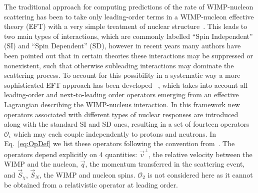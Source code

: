 
The traditional approach for computing predictions of the rate of WIMP-nucleon scattering has been to take only leading-order terms in a WIMP-nucleon effective theory (EFT) with a very simple treatment of nuclear structure~\cite{LEWIN}. This leads to two main types of interactions, which are commonly labelled ``Spin Independent'' (SI) and ``Spin Dependent'' (SD), however in recent years many authors have been pointed out that in certain theories these interactions may be suppressed or nonexistent, such that otherwise subleading interactions may dominate the scattering process. To account for this possibility in a systematic way a more sophisticated EFT approach has been developed ~\cite{Fitzpatrick:2012ib,Anand:MathTools,Fitzpatrick:MathTools}, which takes into account all leading-order and next-to-leading order operators emerging from an effective Lagrangian describing the WIMP-nucleus interaction. In this framework new operators associated with different types of nuclear responses are introduced along with the standard SI and SD ones, resulting in a set of fourteen operators $\mathcal{O}_i$ which may each couple independently to protons and neutrons. In Eq.~\ref{eq:OpDef} we list these operators following the convention from~\cite{Anand:MathTools}. The operators depend explicitly on 4 quantities: $\vec{v}^{\perp}$, the relative velocity between the WIMP and the nucleon, $\vec{q}$, the momentum transferred in the scattering event, and $\vec{S}_\chi$, $\vec{S}_N$, the WIMP and nucleon spins. $\mathcal{O}_2$ is not considered here as it cannot be obtained from a relativistic operator at leading order.
	 
